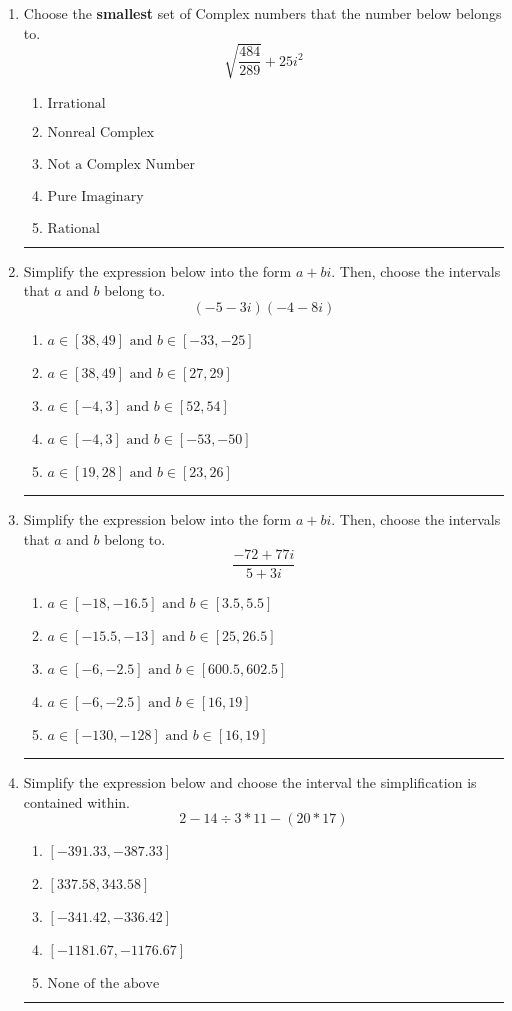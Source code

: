 \documentclass[14pt]{extbook}
\newcommand{\litem}[1]{\item#1\hspace*{-1cm}\rule{\textwidth}{0.4pt}}
\begin{document}
\begin{enumerate}
{\begin{enumerate}[label=\Alph*.]
\end{enumerate} }
\litem{
Choose the \textbf{smallest} set of Complex numbers that the number below belongs to.\[ \sqrt{\frac{484}{289}} + 25i^2 \]\begin{enumerate}[label=\Alph*.]
\item \( \text{Irrational} \)
\item \( \text{Nonreal Complex} \)
\item \( \text{Not a Complex Number} \)
\item \( \text{Pure Imaginary} \)
\item \( \text{Rational} \)

\end{enumerate} }
\litem{
Simplify the expression below into the form $a+bi$. Then, choose the intervals that $a$ and $b$ belong to.\[ (-5 - 3 i)(-4 - 8 i) \]\begin{enumerate}[label=\Alph*.]
\item \( a \in [38, 49] \text{ and } b \in [-33, -25] \)
\item \( a \in [38, 49] \text{ and } b \in [27, 29] \)
\item \( a \in [-4, 3] \text{ and } b \in [52, 54] \)
\item \( a \in [-4, 3] \text{ and } b \in [-53, -50] \)
\item \( a \in [19, 28] \text{ and } b \in [23, 26] \)

\end{enumerate} }
\litem{
Simplify the expression below into the form $a+bi$. Then, choose the intervals that $a$ and $b$ belong to.\[ \frac{-72 + 77 i}{5 + 3 i} \]\begin{enumerate}[label=\Alph*.]
\item \( a \in [-18, -16.5] \text{ and } b \in [3.5, 5.5] \)
\item \( a \in [-15.5, -13] \text{ and } b \in [25, 26.5] \)
\item \( a \in [-6, -2.5] \text{ and } b \in [600.5, 602.5] \)
\item \( a \in [-6, -2.5] \text{ and } b \in [16, 19] \)
\item \( a \in [-130, -128] \text{ and } b \in [16, 19] \)

\end{enumerate} }
\litem{
Simplify the expression below and choose the interval the simplification is contained within.\[ 2 - 14 \div 3 * 11 - (20 * 17) \]\begin{enumerate}[label=\Alph*.]
\item \( [-391.33, -387.33] \)
\item \( [337.58, 343.58] \)
\item \( [-341.42, -336.42] \)
\item \( [-1181.67, -1176.67] \)
\item \( \text{None of the above} \)


\end{enumerate}}
\end{enumerate}
\end{document}

